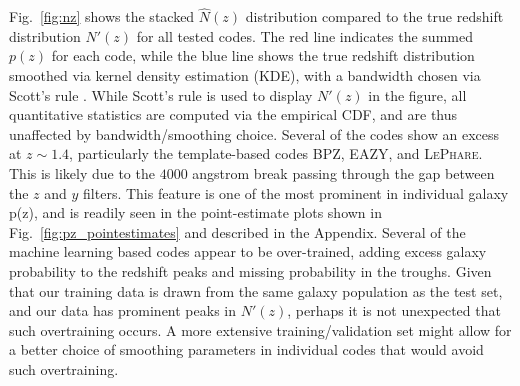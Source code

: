 Fig.~\ref{fig:nz} shows the stacked $\hat{N}(z)$ distribution compared to the true redshift distribution $N'(z)$ for all tested codes.  The red line indicates the summed $p(z)$ for each code, while the blue line shows the true redshift distribution smoothed via kernel density estimation (KDE), with a bandwidth chosen via Scott's rule \citep{Scott:1992}.  While Scott's rule is used to display $N'(z)$ in the figure, all quantitative statistics are computed via the empirical CDF, and are thus unaffected by bandwidth/smoothing choice.
Several of the codes show an excess at $z \sim 1.4$, particularly the template-based codes \textsc{BPZ}, \textsc{EAZY}, and \textsc{LePhare}.
This is likely due to the $4000$ angstrom break passing through the gap between the $z$ and $y$ filters.
This feature is one of the most prominent in individual galaxy p(z), and is readily seen in the point-estimate plots shown in Fig.~\ref{fig:pz_pointestimates} and described in the Appendix.
Several of the machine learning based codes appear to be over-trained, adding excess galaxy probability to the redshift peaks and missing probability in the troughs.
Given that our training data is drawn from the same galaxy population as the test set, and our data has prominent peaks in $N'(z)$, perhaps it is not unexpected that such overtraining occurs.
A more extensive training/validation set might allow for a better choice of smoothing parameters in individual codes that would avoid such overtraining.


